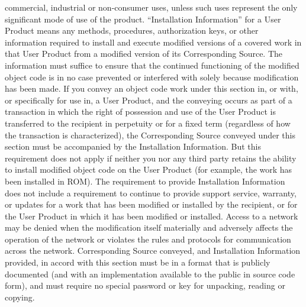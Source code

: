 \documentclass {book}
\begin{document}
\begin{tiny}
commercial, industrial or non-consumer uses, unless such uses represent the only significant mode of use of the product. ``Installation Information'' for a User Product means any methods, procedures, authorization keys, or other information required to install and execute modified versions of a covered work in that User Product from a modified version of its Corresponding Source. The information must suffice to ensure that the continued functioning of the modified object code is in no case prevented or interfered with solely because modification has been made. If you convey an object code work under this section in, or with, or specifically for use in, a User Product, and the conveying occurs as part of a transaction in which the right of possession and use of the User Product is transferred to the recipient in perpetuity or for a fixed term (regardless of how the transaction is characterized), the Corresponding Source conveyed under this section must be accompanied by the Installation Information. But this requirement does not apply if neither you nor any third party retains the ability to install modified object code on the User Product (for example, the work has been installed in ROM). The requirement to provide Installation Information does not include a requirement to continue to provide support service, warranty, or updates for a work that has been modified or installed by the recipient, or for the User Product in which it has been modified or installed. Access to a network may be denied when the modification itself materially and adversely affects the operation of the network or violates the rules and protocols for communication across the network. Corresponding Source conveyed, and Installation Information provided, in accord with this section must be in a format that is publicly documented (and with an implementation available to the public in source code form), and must require no special password or key for unpacking, reading or copying.


\end{tiny}
\end{document}
